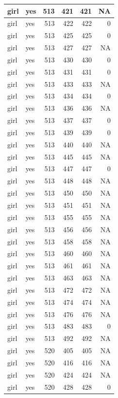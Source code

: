 \documentclass[man]{apa6}
\begin{document}
\begin{tabular}{l|l|r|r|r|r}
\hline
girl & yes & 513 & 421 & 421 & NA\\
\hline
girl & yes & 513 & 422 & 422 & 0\\
\hline
girl & yes & 513 & 425 & 425 & 0\\
\hline
girl & yes & 513 & 427 & 427 & NA\\
\hline
girl & yes & 513 & 430 & 430 & 0\\
\hline
girl & yes & 513 & 431 & 431 & 0\\
\hline
girl & yes & 513 & 433 & 433 & NA\\
\hline
girl & yes & 513 & 434 & 434 & 0\\
\hline
girl & yes & 513 & 436 & 436 & NA\\
\hline
girl & yes & 513 & 437 & 437 & 0\\
\hline
girl & yes & 513 & 439 & 439 & 0\\
\hline
girl & yes & 513 & 440 & 440 & NA\\
\hline
girl & yes & 513 & 445 & 445 & NA\\
\hline
girl & yes & 513 & 447 & 447 & 0\\
\hline
girl & yes & 513 & 448 & 448 & NA\\
\hline
girl & yes & 513 & 450 & 450 & NA\\
\hline
girl & yes & 513 & 451 & 451 & NA\\
\hline
girl & yes & 513 & 455 & 455 & NA\\
\hline
girl & yes & 513 & 456 & 456 & NA\\
\hline
girl & yes & 513 & 458 & 458 & NA\\
\hline
girl & yes & 513 & 460 & 460 & NA\\
\hline
girl & yes & 513 & 461 & 461 & NA\\
\hline
girl & yes & 513 & 463 & 463 & NA\\
\hline
girl & yes & 513 & 472 & 472 & NA\\
\hline
girl & yes & 513 & 474 & 474 & NA\\
\hline
girl & yes & 513 & 476 & 476 & NA\\
\hline
girl & yes & 513 & 483 & 483 & 0\\
\hline
girl & yes & 513 & 492 & 492 & NA\\
\hline
girl & yes & 520 & 405 & 405 & NA\\
\hline
girl & yes & 520 & 416 & 416 & NA\\
\hline
girl & yes & 520 & 424 & 424 & NA\\
\hline
girl & yes & 520 & 428 & 428 & 0\\

\end{tabular}
\end{document}
